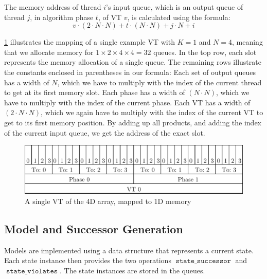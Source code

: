 \documentclass[
fancyheadings, %
%
%
]{stsreprt}
\DeclareMathOperator{\sSuccessor}{\texttt{state\_successor}}
\DeclareMathOperator{\sViolates}{\texttt{state\_violates}}
\begin{document}
The memory address of thread $i$'s input queue, which is an output queue of thread $j$, in algorithm phase $t$, of VT $v$, is calculated using the formula:
\[v \cdot (2 \cdot N \cdot N) + t \cdot (N \cdot N) + j \cdot N + i\]

\cref{fig:4d-mapped-memory} illustrates the mapping of a single example VT with $K=1$ and $N=4$, meaning that we allocate memory for $1 \times 2 \times 4 \times 4 = 32$ queues.
In the top row, each slot represents the memory allocation of a single queue.
The remaining rows illustrate the constants enclosed in parentheses in our formula:
Each set of output queues has a width of $N$, which we have to multiply with the index of the current thread to get at its first memory slot.
Each phase has a width of $(N \cdot N)$, which we have to multiply with the index of the current phase.
Each VT has a width of $(2 \cdot N \cdot N)$, which we again have to multiply with the index of the current VT to get to its first memory position.
By adding up all products, and adding the index of the current input queue, we get the address of the exact slot.

\begin{figure}
    \includegraphics[width=\textwidth]{figures/4d-mapped-memory}
    \caption{A single VT of the 4D array, mapped to 1D memory}
    \label{fig:4d-mapped-memory}
\end{figure}

\subsection{Model and Successor Generation}
\label{section:implementation:successor-generation}

Models are implemented using a data structure that represents a current state.
Each state instance then provides the two operations $\sSuccessor$ and $\sViolates$.
The state instances are stored in the queues.
\end{document}
